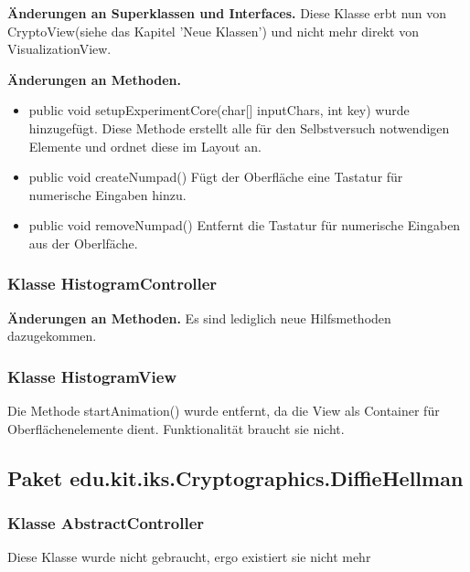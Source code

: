 \documentclass{article}
\begin{document}
	 \textbf{Änderungen an Superklassen und Interfaces.}\newline
	     Diese Klasse erbt nun von CryptoView(siehe das Kapitel 'Neue Klassen') und nicht mehr direkt von VisualizationView.\newline
	   
	 \textbf{Änderungen an Methoden.}\newline
	   \begin{itemize}
	     \item public void setupExperimentCore(char[] inputChars, int key) wurde hinzugefügt.\newline
	           Diese Methode erstellt alle für den Selbstversuch notwendigen Elemente und ordnet diese im Layout an.
             \item public void createNumpad()\newline
               Fügt der Oberfläche eine Tastatur für numerische Eingaben hinzu.
             \item public void removeNumpad()\newline
               Entfernt die Tastatur für numerische Eingaben aus der Oberlfäche.
           \end{itemize}
               
	\subsubsection{Klasse HistogramController}
          \textbf{Änderungen an Methoden.}\newline
           Es sind lediglich neue Hilfsmethoden dazugekommen.
	\subsubsection{Klasse HistogramView}
	 Die Methode startAnimation() wurde entfernt, da die View als Container für Oberflächenelemente dient. 
	 Funktionalität braucht sie nicht.

  \subsection{Paket edu.kit.iks.Cryptographics.DiffieHellman}
  
    \subsubsection{Klasse AbstractController}
    Diese Klasse wurde nicht gebraucht, ergo existiert sie nicht mehr
\end{document}
